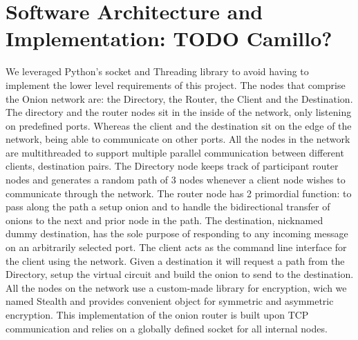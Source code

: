 \documentclass[10pt]{report}
\begin{document}
\section{Software Architecture and Implementation: TODO Camillo?}
We leveraged Python’s socket and Threading library to avoid having to implement the lower level
requirements of this project.  The nodes that comprise the Onion network are: the Directory, the
Router, the Client and the Destination.  The directory and the router nodes sit in the inside of the
network, only listening on predefined ports.  Whereas the client and the destination sit on the edge
of the network, being able to communicate on other ports.  All the nodes in the network are
multithreaded to support multiple parallel communication between different clients, destination
pairs.  The Directory node keeps track of participant router nodes and generates a random path of 3
nodes whenever a client node wishes to communicate through the network.  The router node has 2
primordial function: to pass along the path a setup onion and to handle the bidirectional transfer
of onions to the next and prior node in the path.  The destination, nicknamed dummy destination, has
the sole purpose of responding to any incoming message on an arbitrarily selected port.  The client
acts as the command line interface for the client using the network. Given a destination it will
request a path from the Directory, setup the virtual circuit and build the onion to send to the
destination.  All the nodes on the network use a custom-made library for encryption, wich we named
Stealth and provides convenient object for symmetric and asymmetric encryption.  This implementation
of the onion router is built upon TCP communication and relies on a globally defined socket for all
internal nodes.\\
\end{document}
